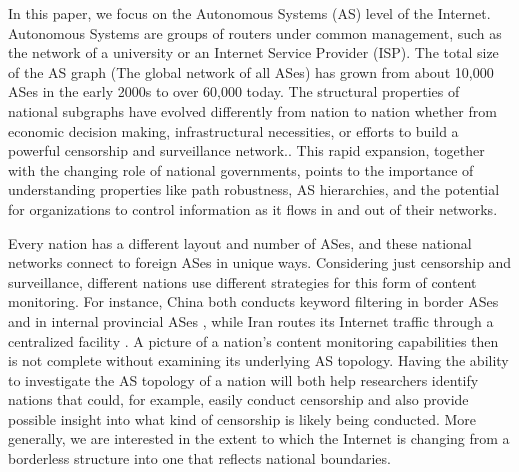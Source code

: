 \par
In this paper, we focus on the Autonomous Systems (AS) level of the Internet.
Autonomous Systems are groups of routers under common management, such as the network of
a university or an Internet Service Provider (ISP).
The total size of the AS graph (The global network 
of all ASes) has grown from about 10,000 ASes in the early 2000s to over 60,000 today. 
The structural properties of national subgraphs have evolved differently
from nation to nation whether from economic decision making, infrastructural necessities, 
or efforts to build a powerful censorship and surveillance network..
This rapid expansion, together with the changing role of national
governments, points to the importance of understanding properties like
path robustness, AS hierarchies, and the potential for organizations to
control information as it flows in and out of their networks.

\par Every nation has a different layout and number of ASes, and these
national networks connect to foreign ASes in unique ways. Considering
just censorship and surveillance, different nations use different
strategies for this form of content monitoring. For instance, China
both conducts keyword filtering in border ASes and in internal
provincial ASes \cite{chinafiltering}, while Iran routes its Internet
traffic through a centralized facility \cite{irancensor}.  A picture
of a nation's content monitoring capabilities then is not complete
without examining its underlying AS topology.  Having the ability to
investigate the AS topology of a nation will both help researchers
identify nations that could, for example, easily conduct censorship
and also provide possible insight into what kind of censorship is
likely being conducted.  More generally, we are interested in the extent to which the Internet is changing from a borderless structure into one that reflects national boundaries. 

